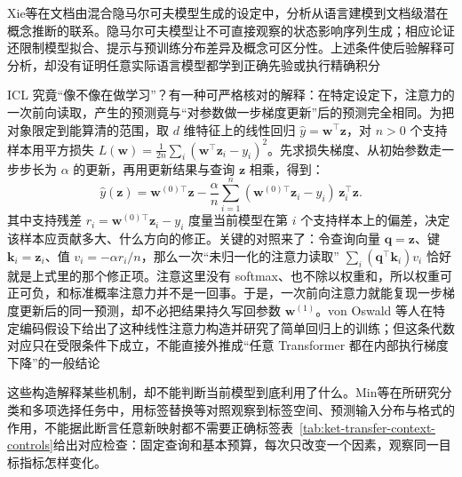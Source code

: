 Xie等在文档由混合隐马尔可夫模型生成的设定中，分析从语言建模到文档级潜在概念推断的联系。隐马尔可夫模型让不可直接观察的状态影响序列生成；相应论证还限制模型拟合、提示与预训练分布差异及概念可区分性。上述条件使后验解释可分析，却没有证明任意实际语言模型都学到正确先验或执行精确积分

ICL 究竟“像不像在做学习”？有一种可严格核对的解释：在特定设定下，注意力的一次前向读取，产生的预测竟与“对参数做一步梯度更新”后的预测完全相同。为把对象限定到能算清的范围，取 $d$ 维特征上的线性回归 $\hat y=\bm w^\top\bm z$，对 $n>0$ 个支持样本用平方损失 $L(\bm w)=\frac1{2n}\sum_i(\bm w^\top\bm z_i-y_i)^2$。先求损失梯度、从初始参数走一步步长为 $\alpha$ 的更新，再用更新结果与查询 $\bm z$ 相乘，得到：
\begin{equation}
  \hat y(\bm z)
  =\bm w^{(0)\top}\bm z
   -\frac{\alpha}{n}\sum_{i=1}^{n}
     (\bm w^{(0)\top}\bm z_i-y_i)\,\bm z_i^\top\bm z.
  \label{eq:ket-transfer-context-gd}
\end{equation}
其中支持残差 $r_i=\bm w^{(0)\top}\bm z_i-y_i$ 度量当前模型在第 $i$ 个支持样本上的偏差，决定该样本应贡献多大、什么方向的修正。关键的对照来了：令查询向量 $\bm q=\bm z$、键 $\bm k_i=\bm z_i$、值 $v_i=-\alpha r_i/n$，那么一次“未归一化的注意力读取” $\sum_i(\bm q^\top\bm k_i)v_i$ 恰好就是上式里的那个修正项。注意这里没有 softmax、也不除以权重和，所以权重可正可负，和标准概率注意力并不是一回事。于是，一次前向注意力就能复现一步梯度更新后的同一预测，却不必把结果持久写回参数 $\bm w^{(1)}$。von Oswald 等人在特定编码假设下给出了这种线性注意力构造并研究了简单回归上的训练；但这条代数对应只在受限条件下成立，不能直接外推成“任意 Transformer 都在内部执行梯度下降”的一般结论

这些构造解释某些机制，却不能判断当前模型到底利用了什么。Min等在所研究分类和多项选择任务中，用标签替换等对照观察到标签空间、预测输入分布与格式的作用，不能据此断言任意新映射都不需要正确标签表~\ref{tab:ket-transfer-context-controls}给出对应检查：固定查询和基本预算，每次只改变一个因素，观察同一目标指标怎样变化。

